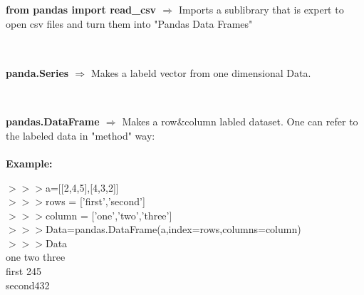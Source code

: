 \documentclass[a4paper,18pt]{article}
\begin{document}
\subsection{\colorbox {matgreen}{\color{white}{\large from pandas import read\_csv}}}
\textbf{from pandas import read\_csv $\Rightarrow$} Imports a sublibrary that is expert to open csv files and turn them into "Pandas Data Frames"\\\\


\subsection{\colorbox {matgreen}{\color{white}{\large pandas.Series(data=Data, index=labels)}}}
\textbf{panda.Series $\Rightarrow$} Makes a labeld vector from one dimensional Data.\\\\


\subsection{\colorbox {matgreen}{\color{white}{\large pandas.DataFrame(data=Data, index = rowlabels , columns = column labels)}}}
\textbf{pandas.DataFrame $\Rightarrow$} Makes a row\&column labled dataset. One can refer to the labeled data in "method" way:\\\\
\textbf{Example:\\}

$>>>$a=[[2,4,5],[4,3,2]]\\

$>>>$rows = ['first','second']\\

$>>>$column = ['one','two','three']\\

$>>>$Data=pandas.DataFrame(a,index=rows,columns=column)\\

$>>>$Data\\

\hspace{14pt} one  two  three\\
first \hspace*{16pt}2\hspace*{14pt}4\hspace*{14pt}5\\
second\hspace*{8pt}4\hspace*{14pt}3\hspace*{14pt}2\\
\end{document}
